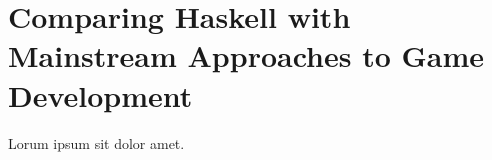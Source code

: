 \section{Comparing Haskell with Mainstream Approaches to Game Development}

Lorum ipsum sit dolor amet.  \lipsum[2-4]